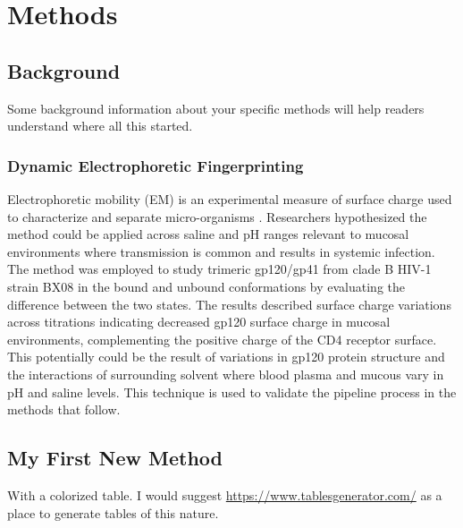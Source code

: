 \pagestyle{plain}
\chapter{Methods} 
\renewcommand{\thetable}{\arabic{chapter}.\arabic{table}}  
\renewcommand{\thefigure}{\arabic{chapter}.\arabic{figure}} 

\section{Background}
Some background information about your specific methods will help readers understand where all this started.
\subsection{Dynamic Electrophoretic Fingerprinting}
Electrophoretic mobility (EM) is an experimental measure of surface charge used to characterize and separate micro-organisms \citep{Mehrishi2002,Richmond1973}. Researchers hypothesized the method could be applied across saline and pH ranges relevant to mucosal environments where transmission is common and results in systemic infection. The method was employed to study trimeric gp120/gp41 from clade B HIV-1 strain BX08 \citep{Stieh2013} in the bound and unbound conformations by evaluating the difference between the two states. The results described surface charge variations across titrations indicating decreased gp120 surface charge in mucosal environments, complementing the positive charge of the CD4 receptor surface. This potentially could be the result of variations in gp120 protein structure and the interactions of surrounding solvent where blood plasma and mucous vary in pH and saline levels. This technique is used to validate the pipeline process in the methods that follow.


\section{My First New Method}
With a colorized table. I would suggest \href{https://www.tablesgenerator.com/}{https://www.tablesgenerator.com/} as a place to generate tables of this nature.
 
